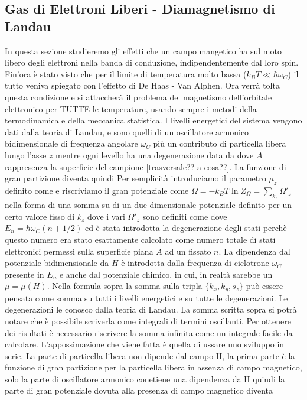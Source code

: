 \subsection{Gas di Elettroni Liberi - Diamagnetismo di Landau}
In questa sezione studieremo gli effetti che un campo mangetico ha sul moto libero degli elettroni nella banda di conduzione, indipendentemente dal loro spin. Fin'ora \`e stato visto che per il limite di temperatura molto bassa ($k_BT\ll\hbar\omega_C$) il tutto veniva spiegato con l'effetto di De Haas - Van Alphen. Ora verr\`a tolta questa condizione e si attaccher\`a il problema del magnetismo dell'orbitale elettronico per TUTTE le temperature, usando sempre i metodi della termodinamica e della meccanica statistica. I livelli energetici del sistema vengono dati dalla teoria di Landau, e sono quelli di un oscillatore armonico bidimensionale di frequenza angolare $\omega_C$ pi\`u un contributo di particella libera lungo l'asse $z$
mentre ogni levello ha una degenerazione data da 
dove $A$ rappresenza la superficie del campione [trasversale?? a cosa??]. La funzione di gran partizione diventa quindi
Per semplicit\`a introduciamo il parametro $\mu_z$ definito come 
e riscriviamo il gran potenziale come $\Omega = -k_BT\ln Z_\Omega = \sum_{k_z} \Omega'_z$ nella forma di una somma su di un due-dimensionale potenziale definito per un certo valore fisso di $k_z$ dove i vari $\Omega'_z$ sono definiti come 
dove $E_n=\hbar\omega_C(n+1/2)$ ed \`e stata introdotta la degenerazione degli stati perch\`e questo numero era stato esattamente calcolato come numero totale di stati elettronici permessi sulla superficie piana $A$ ad un fissato $n$. La dipendenza dal potenziale bidimensionale da $H$ \`e introdotta dalla frequenza di ciclotrone $\omega_C$ presente in $E_n$ e anche dal potenziale chimico, in cui, in realt\`a sarebbe un $\mu=\mu(H)$. Nella formula sopra la somma sulla tripla $\{k_x, k_y, s_z\}$ pu\`o essere pensata come somma su tutti i livelli energetici e su tutte le degenerazioni. Le degenerazioni le conosco dalla teoria di Landau. La somma scritta sopra si potr\`a notare che \`e possibile scriverla come integrali di termini oscillanti. Per ottenere dei risultati \`e necessario riscrivere la somma infinita come un integrale facile da calcolare. L'appossimazione che viene fatta \`e quella di ussare uno sviluppo in serie. La parte di particella libera non dipende dal campo H, la prima parte \`e la funzione di gran partizione per la particella libera in assenza di campo magnetico, solo la parte di oscillatore armonico conetiene una dipendenza da H quindi la parte di gran potenziale dovuta alla presenza di campo magnetico diventa
